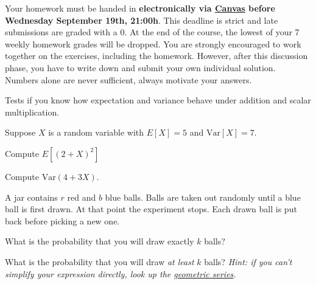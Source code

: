 \documentclass[a4paper,10pt,landscape,twocolumn]{scrartcl}
\newcommand\deadline{Wednesday September 19th, 21:00h}
\begin{document}
\homeworkproblems

{\sffamily\noindent
Your homework must be handed in \textbf{electronically via \href{\canvasURL}{Canvas} before \deadline}. 
This deadline is strict and late submissions are graded with a 0. At the end of the course, the lowest of your 7 weekly homework grades will be dropped. You are strongly encouraged to work together on the exercises, including the homework. However, after this discussion phase, you have to write down and submit your own individual solution. Numbers alone are never sufficient, always motivate your answers.
}



\begin{exercise}
	\begin{mycomment}
		Tests if you know how expectation and variance behave under addition and scalar multiplication.
	\end{mycomment}
	
	Suppose $X$ is a random variable with $E[X] = 5$ and $\mathrm{Var}[X] = 7$.	
	\begin{subex}[0.5pt]
	Compute $E[(2+X)^2]$
	\end{subex}	
	
	\begin{subex}[0.5pt]
	Compute $\mathrm{Var}(4+3X)$.
	\end{subex}

\end{exercise}


\begin{exercise}
A jar contains $r$ red and $b$ blue balls. Balls are taken out randomly until a blue ball is first drawn. At that point the experiment stops. Each drawn ball is put back before picking a new one.
	\begin{subex}[1pt]
		What is the probability that you will draw exactly $k$ balls? 
	\end{subex}
	
	\begin{subex}[1.5pt]
		What is the probability that you will draw \emph{at
                  least} $k$ balls? \emph{Hint: if you can't simplify
                  your expression directly, look up the \href{https://en.wikipedia.org/wiki/Geometric_series}{geometric series}.}
	\end{subex}
\end{exercise}
\end{document}
